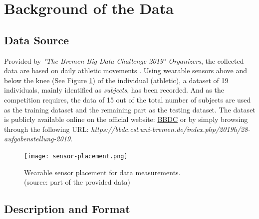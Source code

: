 %
%
%
%
%
%


\section{Background of the Data}
\subsection{Data Source}

Provided by \emph{"The Bremen Big Data Challenge 2019" Organizers}, the collected data are based on
daily athletic movements \parencite{bbdc}. Using wearable sensors above and below the knee (See
Figure \ref{fig:sensor-placement}) of the individual (athletic), a dataset of 19 individuals, mainly
identified as \emph{subjects}, has been recorded. And as the competition requires, the data of 15
out of the total number of subjects are used as the training dataset and the remaining part as the
testing dataset. The dataset is publicly available online on the official website:
\href{https://bbdc.csl.uni-bremen.de/images/2019/bbdc_2019_Bewegungsdaten_mit_referenz.zip}{BBDC} or
by simply browsing through the following URL: \emph{https://bbdc.csl.uni-bremen.de/index.php/2019h/28-aufgabenstellung-2019}.

\begin{figure}[h!]
    \centering
    \texttt{[image: sensor-placement.png]}
    \caption{Wearable sensor placement for data measurements. \\ (source: part of the provided data)}
    \label{fig:sensor-placement}
\end{figure}

\subsection{Description and Format}

